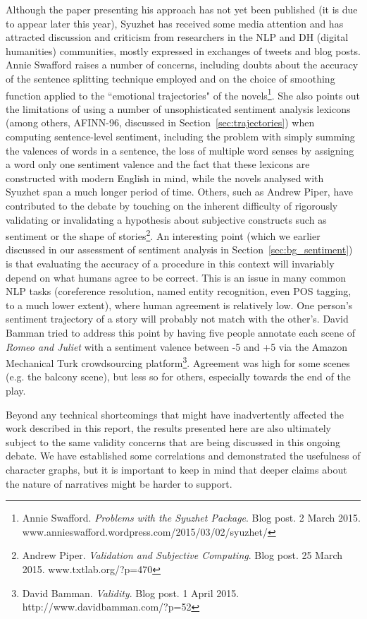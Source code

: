 \documentclass[bsc,frontabs,deptreport,singlespacing,parskip, twoside]{infthesis}
\begin{document}
Although the paper presenting his approach has not yet been published (it is due to appear later this year), Syuzhet has received some media attention and has attracted discussion and criticism from researchers in the NLP and DH (digital humanities) communities, mostly expressed in exchanges of tweets and blog posts. Annie Swafford raises a number of concerns, including doubts about the accuracy of the sentence splitting technique employed and on the choice of smoothing function applied to the ``emotional trajectories" of the novels\footnote{Annie Swafford. \textit{Problems with the Syuzhet Package}. Blog post. 2 March 2015. www.annieswafford.wordpress.com/2015/03/02/syuzhet/ }. She also points out the limitations of using a number of unsophisticated sentiment analysis lexicons (among others, AFINN-96, discussed in Section~\ref{sec:trajectories}) when computing sentence-level sentiment, including the problem with simply summing the valences of words in a sentence, the loss of multiple word senses by assigning a word only one sentiment valence and the fact that these lexicons are constructed with modern English in mind, while the novels analysed with Syuzhet span a much longer period of time. Others, such as Andrew Piper, have contributed to the debate by touching on the inherent difficulty of rigorously validating or invalidating a hypothesis about subjective constructs such as sentiment or the shape of stories\footnote{Andrew Piper. \textit{Validation and Subjective Computing}. Blog post. 25 March 2015. www.txtlab.org/?p=470}. An interesting point (which we earlier discussed in our assessment of sentiment analysis in Section~\ref{sec:bg_sentiment}) is that evaluating the accuracy of a procedure in this context will invariably depend on what humans agree to be correct. This is an issue in many common NLP tasks (coreference resolution, named entity recognition, even POS tagging, to a much lower extent), where human agreement is relatively low. One person's sentiment trajectory of a story will probably not match with the other's. David Bamman tried to address this point by having five people annotate each scene of \textit{Romeo and Juliet} with a sentiment valence between -5 and +5 via the Amazon Mechanical Turk crowdsourcing platform\footnote{David Bamman. \textit{Validity}. Blog post. 1 April 2015. http://www.davidbamman.com/?p=52}. Agreement was high for some scenes (e.g. the balcony scene), but less so for others, especially towards the end of the play.

Beyond any technical shortcomings that might have inadvertently affected the work described in this report, the results presented here are also ultimately subject to the same validity concerns that are being discussed in this ongoing debate. We have established some correlations and demonstrated the usefulness of character graphs, but it is important to keep in mind that deeper claims about the nature of narratives might be harder to support.





\appendix

\end{document}

